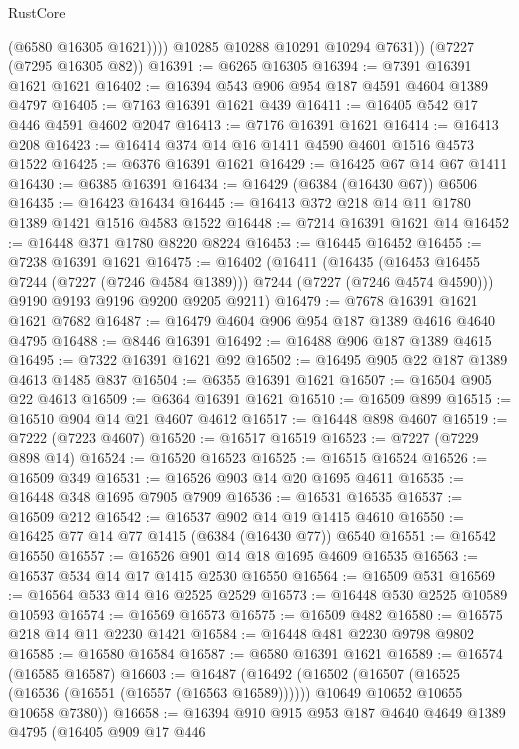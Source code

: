 \begin{lexlean}{RustCore}
\begin{coremodule}
              (@6580 @16305 @1621))))
        @10285
        @10288
        @10291
        @10294
        @7631))
    (@7227 (@7295 @16305 @82))
@16391 := @6265 @16305
@16394 := @7391 @16391 @1621 @1621
@16402 := @16394 @543 @906 @954 @187 @4591 @4604 @1389 @4797
@16405 := @7163 @16391 @1621 @439
@16411 := @16405 @542 @17 @446 @4591 @4602 @2047
@16413 := @7176 @16391 @1621
@16414 := @16413 @208
@16423 := @16414 @374 @14 @16 @1411 @4590 @4601 @1516 @4573 @1522
@16425 := @6376 @16391 @1621
@16429 := @16425 @67 @14 @67 @1411
@16430 := @6385 @16391
@16434 := @16429 (@6384 (@16430 @67)) @6506
@16435 := @16423 @16434
@16445 := @16413 @372 @218 @14 @11 @1780 @1389 @1421 @1516 @4583 @1522
@16448 := @7214 @16391 @1621 @14
@16452 := @16448 @371 @1780 @8220 @8224
@16453 := @16445 @16452
@16455 := @7238 @16391 @1621
@16475 := @16402
    (@16411
      (@16435 (@16453 @16455 @7244 (@7227 (@7246 @4584 @1389))) @7244 (@7227 (@7246 @4574 @4590)))
      @9190
      @9193
      @9196
      @9200
      @9205
      @9211)
@16479 := @7678 @16391 @1621 @1621 @7682
@16487 := @16479 @4604 @906 @954 @187 @1389 @4616 @4640 @4795
@16488 := @8446 @16391
@16492 := @16488 @906 @187 @1389 @4615
@16495 := @7322 @16391 @1621 @92
@16502 := @16495 @905 @22 @187 @1389 @4613 @1485 @837
@16504 := @6355 @16391 @1621
@16507 := @16504 @905 @22 @4613
@16509 := @6364 @16391 @1621
@16510 := @16509 @899
@16515 := @16510 @904 @14 @21 @4607 @4612
@16517 := @16448 @898 @4607
@16519 := @7222 (@7223 @4607)
@16520 := @16517 @16519
@16523 := @7227 (@7229 @898 @14)
@16524 := @16520 @16523
@16525 := @16515 @16524
@16526 := @16509 @349
@16531 := @16526 @903 @14 @20 @1695 @4611
@16535 := @16448 @348 @1695 @7905 @7909
@16536 := @16531 @16535
@16537 := @16509 @212
@16542 := @16537 @902 @14 @19 @1415 @4610
@16550 := @16425 @77 @14 @77 @1415 (@6384 (@16430 @77)) @6540
@16551 := @16542 @16550
@16557 := @16526 @901 @14 @18 @1695 @4609 @16535
@16563 := @16537 @534 @14 @17 @1415 @2530 @16550
@16564 := @16509 @531
@16569 := @16564 @533 @14 @16 @2525 @2529
@16573 := @16448 @530 @2525 @10589 @10593
@16574 := @16569 @16573
@16575 := @16509 @482
@16580 := @16575 @218 @14 @11 @2230 @1421
@16584 := @16448 @481 @2230 @9798 @9802
@16585 := @16580 @16584
@16587 := @6580 @16391 @1621
@16589 := @16574 (@16585 @16587)
@16603 := @16487
    (@16492
      (@16502
        (@16507 (@16525 (@16536 (@16551 (@16557 (@16563 @16589))))))
        @10649
        @10652
        @10655
        @10658
        @7380))
@16658 := @16394
    @910
    @915
    @953
    @187
    @4640
    @4649
    @1389
    @4795
    (@16405
      @909
      @17
      @446

\end{coremodule}
\end{lexlean}
